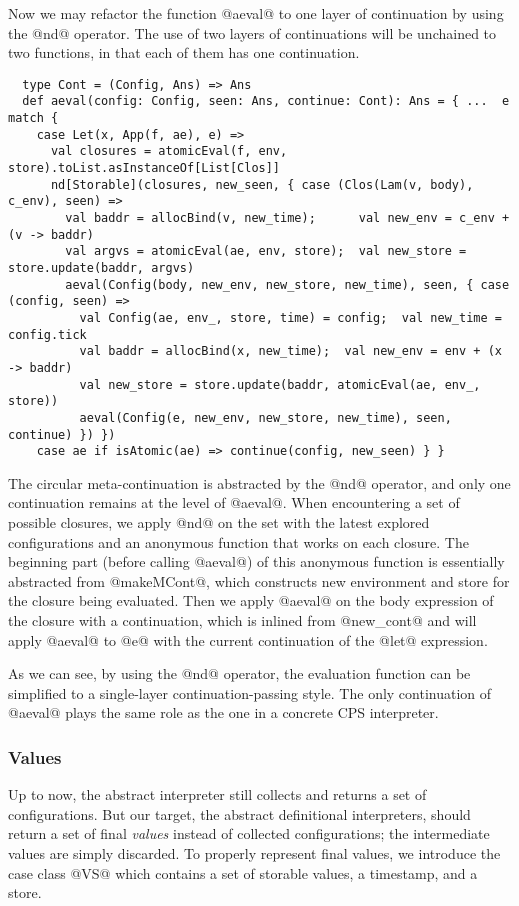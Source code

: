 \documentclass[acmsmall, screen]{acmart}\settopmatter{}
\begin{document}
Now we may refactor the function @aeval@ to one layer of continuation by using 
the @nd@ operator.
The use of two layers of continuations will be unchained to two functions, in that each of them 
has one continuation.

\begin{lstlisting}
  type Cont = (Config, Ans) => Ans
  def aeval(config: Config, seen: Ans, continue: Cont): Ans = { ...  e match {
    case Let(x, App(f, ae), e) =>
      val closures = atomicEval(f, env, store).toList.asInstanceOf[List[Clos]]
      nd[Storable](closures, new_seen, { case (Clos(Lam(v, body), c_env), seen) =>
        val baddr = allocBind(v, new_time);      val new_env = c_env + (v -> baddr)
        val argvs = atomicEval(ae, env, store);  val new_store = store.update(baddr, argvs)
        aeval(Config(body, new_env, new_store, new_time), seen, { case (config, seen) =>
          val Config(ae, env_, store, time) = config;  val new_time = config.tick
          val baddr = allocBind(x, new_time);  val new_env = env + (x -> baddr)
          val new_store = store.update(baddr, atomicEval(ae, env_, store))
          aeval(Config(e, new_env, new_store, new_time), seen, continue) }) })
    case ae if isAtomic(ae) => continue(config, new_seen) } }
\end{lstlisting}

The circular meta-continuation is abstracted by the @nd@ operator, and only one continuation
remains at the level of @aeval@. 
When encountering a set of possible closures, we apply @nd@ on the set with the latest explored
configurations and an anonymous function that works on each closure. The beginning part 
(before calling @aeval@) of this anonymous function is essentially abstracted from @makeMCont@, 
which constructs new environment and store for the closure being evaluated.
Then we apply @aeval@ on the body expression of the closure with a continuation, 
which is inlined from @new_cont@ and will apply @aeval@ to @e@ with the current continuation of the @let@ expression.

As we can see, by using the @nd@ operator, the evaluation function can be simplified to a 
single-layer continuation-passing style.
The only continuation of @aeval@ plays the same role as the one in a concrete CPS interpreter.

\subsubsection{Values}

Up to now, the abstract interpreter still collects and returns a set of configurations.
But our target, the abstract definitional interpreters, should return a set of final \textit{values}
instead of collected configurations; the intermediate values are simply discarded.
To properly represent final values, we introduce the case class @VS@ which
contains a set of storable values, a timestamp, and a store.
\end{document}
